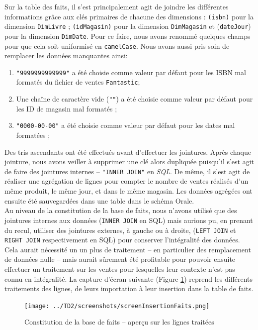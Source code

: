 	Sur la table des faits, il s'est principalement agit de joindre les différentes informations grâce aux clés primaires de chacune des dimensions : \texttt{(isbn)} pour la dimension \texttt{DimLivre} ; \texttt{(idMagasin)} pour la dimension \texttt{DimMagasin} et (\texttt{dateJour}) pour la dimension \texttt{DimDate}. Pour ce faire, nous avons renommé quelques champs pour que cela soit uniformisé en \texttt{camelCase}. Nous avons aussi pris soin de remplacer les données manquantes ainsi:
	\begin{enumerate}
		\item \texttt{"9999999999999"} a été choisie comme valeur par défaut pour les ISBN mal formatés du fichier de ventes \texttt{Fantastic};
		\item Une chaîne de caractère vide (\texttt{""}) a été choisie comme valeur par défaut pour les ID de magasin mal formatés ;
		\item \texttt{"0000-00-00"} a été choisie comme valeur par défaut pour les dates mal formatées ;
	\end{enumerate}

	Des tris ascendants ont été effectués avant d'effectuer les jointures. Après chaque jointure, nous avons veiller à supprimer une clé alors dupliquée puisqu'il s'est agit de faire des jointures internes -- \texttt{"INNER JOIN"} en \textit{SQL}. De même, il s'est agit de réaliser une agrégation de lignes pour compter le nombre de ventes réalisés d'un même produit, le même jour, et dans le même magasin. Les données agrégées ont ensuite été sauvegardées dans une table dans le schéma Orale.\\

	Au niveau de la constitution de la base de faits, nous n'avons utilisé que des jointures internes aux données (\texttt{INNER JOIN} en SQL) mais aurions pu, en prenant du recul, utiliser des jointures externes, à gauche ou à droite, (\texttt{LEFT JOIN} et \texttt{RIGHT JOIN} respectivement en SQL) pour conserver l'intégralité des données. Cela aurait nécessité un un plus de traitement -- en particulier des remplacement de données nulle -- mais aurait sûrement été profitable pour pouvoir ensuite effectuer un traitement sur les ventes pour lesquelles leur contexte n'est pas connu en intégralité. La capture d'écran suivante (Figure \ref{traitementFaits}) reprend les différents traitements des lignes, de leurs importation à leur insertion dans la table de faits.
	
	\begin{figure}[H]
      \centerline{\texttt{[image: ../TD2/screenshots/screenInsertionFaits.png]}}
      \caption{Constitution de la base de faits -- aperçu sur les lignes traitées}
      \label{traitementFaits}
  	\end{figure}


